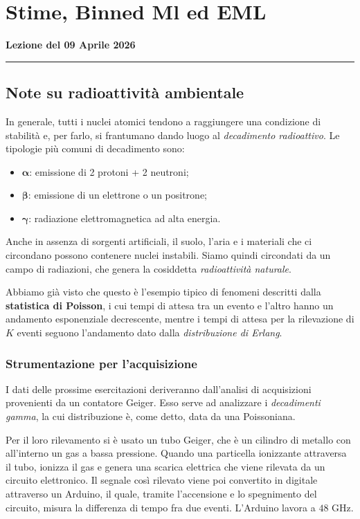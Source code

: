 \documentclass[openany,a4paper,12pt]{book}
\theoremstyle{remark}
\newcommand{\thelezione}{}
\newcommand{\lezione}[2]{
\newpage
\renewcommand{\thelezione}{#2} 
\section{#1} 
\noindent\textbf{\color{RoyalBlue}Lezione del #2}\par\vspace{0.5em}\hrule\vspace{1em}
}
\begin{document}
\lezione{Stime, Binned Ml ed EML}{09 Aprile 2026}

\subsection*{Note su radioattività ambientale}
In generale, tutti i nuclei atomici tendono a raggiungere una condizione di stabilità e, per farlo, si frantumano dando luogo al \textit{decadimento radioattivo}. Le tipologie più comuni di decadimento sono:
\begin{itemize}
    \item $\boldsymbol{\alpha}$: emissione di 2 protoni + 2 neutroni;
    \item $\boldsymbol{\beta}$: emissione di un elettrone o un positrone;
    \item $\boldsymbol{\gamma}$: radiazione elettromagnetica ad alta energia.
\end{itemize}
Anche in assenza di sorgenti artificiali, il suolo, l'aria e i materiali che ci circondano possono contenere nuclei instabili. Siamo quindi circondati da un campo di radiazioni, che genera la cosiddetta \textit{radioattività naturale}.

Abbiamo già visto che questo è l'esempio tipico di fenomeni descritti dalla \textbf{statistica di Poisson}, i cui tempi di attesa tra un evento e l'altro hanno un andamento esponenziale decrescente, mentre i tempi di attesa per la rilevazione di $K$ eventi seguono l'andamento dato dalla \textit{distribuzione di Erlang}.

\subsubsection*{Strumentazione per l'acquisizione}
I dati delle prossime esercitazioni deriveranno dall'analisi di acquisizioni provenienti da un contatore Geiger. Esso serve ad analizzare i \textit{decadimenti gamma}, la cui distribuzione è, come detto, data da una Poissoniana.

Per il loro rilevamento si è usato un tubo Geiger, che è un cilindro di metallo con all'interno un gas a bassa pressione. Quando una particella ionizzante attraversa il tubo, ionizza il gas e genera una scarica elettrica che viene rilevata da un circuito elettronico. Il segnale così rilevato viene poi convertito in digitale attraverso un Arduino, il quale, tramite l'accensione e lo spegnimento del circuito, misura la differenza di tempo fra due eventi. L'Arduino lavora a $48\text{ GHz}$.
\end{document}
